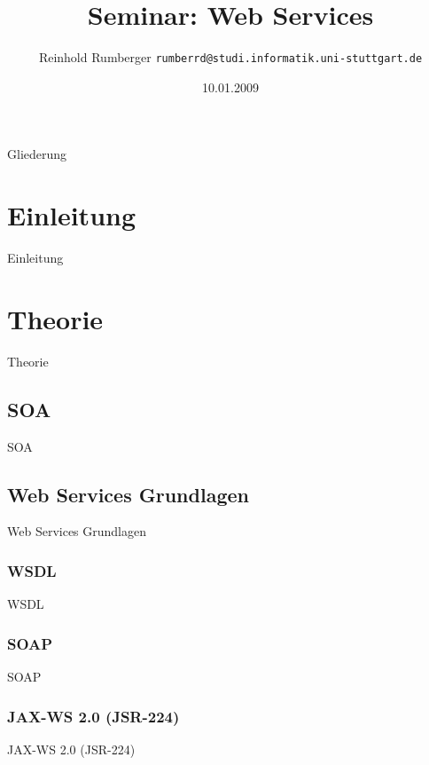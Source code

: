 \documentclass[ucs]{beamer}
\title{Seminar: Web Services}
\author[Reinhold Rumberger]{Reinhold Rumberger \texttt{rumberrd@studi.informatik.uni-stuttgart.de}}
\date{10.01.2009}
\begin{document}
  \begin{frame}
    \titlepage
  \end{frame}

  \begin{frame}{Gliederung}
    \tableofcontents
  \end{frame}

  \section{Einleitung}
  \begin{frame}{Einleitung}
  \end{frame}

  \section{Theorie}
  \begin{frame}{Theorie}
  \end{frame}

  \subsection{SOA}
  \begin{frame}{SOA}
  \end{frame}

  \subsection{Web Services Grundlagen}
  \begin{frame}{Web Services Grundlagen}
  \end{frame}

  \subsubsection{WSDL}
  \begin{frame}{WSDL}
  \end{frame}

  \subsubsection{SOAP}
  \begin{frame}{SOAP}
  \end{frame}

  \subsubsection{JAX-WS 2.0 (JSR-224)}
  \begin{frame}{JAX-WS 2.0 (JSR-224)}
  \end{frame}
\end{document}
